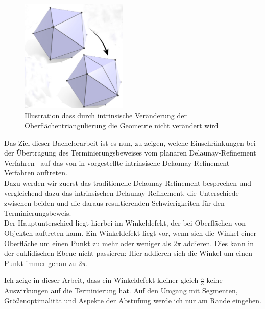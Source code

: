 \begin{figure}[H]%
    
    \centering
    \includegraphics[width=2in]{images/intrinsch_kantenflip.jpg}
  \caption{Illustration  dass durch intrinsische Veränderung der Oberflächentriangulierung  die Geometrie nicht verändert wird~\cite{Sharp:2019:NIT}}
  \label{fig:intrinischer_kanten_flip}
\end{figure}
\newpage
Das Ziel dieser Bachelorarbeit ist es nun, zu zeigen, welche Einschränkungen bei der Übertragung des Terminierungsbeweises vom planaren Delaunay-Refinement  Verfahren~\cite{chew:1989:guaranteed,ruppert:1995:delaunay,SHEWCHUK:2002:chuws} auf das von  \citeauthor{Sharp:2019:NIT} in   \cite{Sharp:2019:NIT}  vorgestellte intrinsische Delaunay-Refinement  Verfahren auftreten.\\ Dazu werden wir zuerst das traditionelle Delaunay-Refinement  besprechen und vergleichend dazu das intrinsischen Delaunay-Refinement, die Unterschiede zwischen beiden und die daraus resultierenden Schwierigkeiten für den Terminierungsbeweis.\\ 


Der Hauptunterschied liegt hierbei im Winkeldefekt, der bei Oberflächen von Objekten auftreten kann. Ein Winkeldefekt liegt vor, wenn sich die Winkel einer Oberfläche um einen Punkt zu mehr oder weniger als $2\pi$ addieren. Dies kann in der euklidischen Ebene nicht passieren: Hier addieren sich die Winkel um einen Punkt immer genau zu $2\pi$.



Ich zeige in dieser Arbeit, dass ein Winkeldefekt kleiner gleich $\frac{5}{3}$ keine Auswirkungen auf die Terminierung hat. Auf den Umgang mit Segmenten, Größenoptimalität und Aspekte der Abstufung werde ich nur am Rande eingehen.\\










